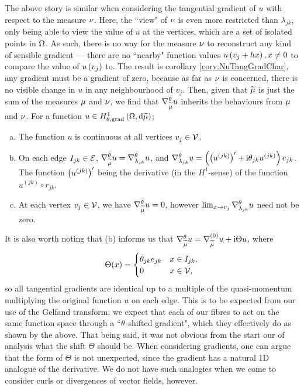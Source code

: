 The above story is similar when considering the tangential gradient of $u$ with respect to the measure $\nu$.
Here, the ``view" of $\nu$ is even more restricted than $\lambda_{jk}$, only being able to view the value of $u$ at the vertices, which are a set of isolated points in $\Omega$.
As such, there is no way for the measure $\nu$ to reconstruct any kind of sensible gradient --- there are no ``nearby" function values $u\left( v_j + h x \right), x\neq 0$ to compare the value of $u\left( v_j \right)$ to.
The result is corollary \ref{cory:NuTangGradChar}, any gradient must be a gradient of zero, because as far as $\nu$ is concerned, there is no visible change in $u$ in any neighbourhood of $v_j$.
Then, given that $\widetilde{\mu}$  is just the sum of the measures $\mu$ and $\nu$, we find that $\nabla^{\theta}_{\widetilde{\mu}}u$ inherits the behaviours from $\mu$ and $\nu$.
For a function $u\in H^1_{\theta, \mathrm{grad}}\left( \Omega, \mathrm{d}\widetilde{\mu} \right)$;
\begin{enumerate}[(a)]
	\item The function $u$ is continuous at all vertices $v_j\in\mathcal{V}$.
	\item On each edge $I_{jk}\in\mathcal{E}$, $\nabla^{\theta}_{\widetilde{\mu}}u = \nabla^{\theta}_{\lambda_{jk}}u$, and $\nabla^{\theta}_{\lambda_{jk}}u = \left( \left( u^{(jk)} \right)' + \mathrm{i}\theta_{jk}u^{(jk)} \right)e_{jk}$.
	The function $\left( u^{(jk)} \right)'$ being the derivative (in the $H^1$-sense) of the function $u^{(jk)}\circ r_{jk}$.
	\item At each vertex $v_j\in\mathcal{V}$, we have $\nabla^{\theta}_{\widetilde{\mu}}u=0$, however $\lim_{x\rightarrow v_j}\nabla^{\theta}_{\lambda_{jk}}u$ need not be zero.
\end{enumerate}
It is also worth noting that (b) informs us that $\nabla^{\theta}_{\widetilde{\mu}}u = \nabla^{(0)}_{\widetilde{\mu}}u + \mathrm{i}\Theta u$, where 
\begin{align*}
	\Theta(x) = 
	\begin{cases} \theta_{jk}e_{jk} & x\in I_{jk}, \\ 0 & x\in\mathcal{V}, \end{cases}
\end{align*}
so all tangential gradients are identical up to a multiple of the quasi-momentum multiplying the original function $u$ on each edge.
This is to be expected from our use of the Gelfand transform; we expect that each of our fibres to act on the same function space through a ``$\theta$-shifted gradient", which they effectively do as shown by the above.
That being said, it was not obvious from the start our of analysis what the shift $\Theta$ should be.
When considering gradients, one can argue that the form of $\Theta$ is not unexpected, since the gradient has a natural 1D analogue of the derivative.
We do not have such analogies when we come to consider curls or divergences of vector fields, however.